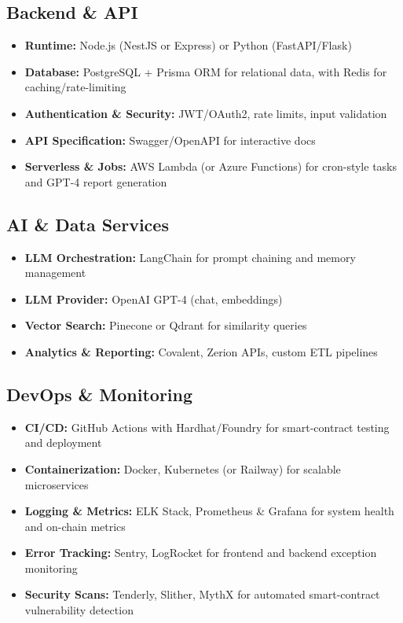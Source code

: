 \documentclass[13pt]{extarticle}
\begin{document}
\subsection{Backend \& API}
\begin{itemize}[left=1em]
  \item \textbf{Runtime:} Node.js (NestJS or Express) or Python (FastAPI/Flask)  
  \item \textbf{Database:} PostgreSQL + Prisma ORM for relational data, with Redis for caching/rate-limiting  
  \item \textbf{Authentication \& Security:} JWT/OAuth2, rate limits, input validation  
  \item \textbf{API Specification:} Swagger/OpenAPI for interactive docs  
  \item \textbf{Serverless \& Jobs:} AWS Lambda (or Azure Functions) for cron-style tasks and GPT-4 report generation  
\end{itemize}

\subsection{AI \& Data Services}
\begin{itemize}[left=1em]
  \item \textbf{LLM Orchestration:} LangChain for prompt chaining and memory management  
  \item \textbf{LLM Provider:} OpenAI GPT-4 (chat, embeddings)  
  \item \textbf{Vector Search:} Pinecone or Qdrant for similarity queries  
  \item \textbf{Analytics \& Reporting:} Covalent, Zerion APIs, custom ETL pipelines  
\end{itemize}

\subsection{DevOps \& Monitoring}
\begin{itemize}[left=1em]
  \item \textbf{CI/CD:} GitHub Actions with Hardhat/Foundry for smart-contract testing and deployment  
  \item \textbf{Containerization:} Docker, Kubernetes (or Railway) for scalable microservices  
  \item \textbf{Logging \& Metrics:} ELK Stack, Prometheus \& Grafana for system health and on-chain metrics  
  \item \textbf{Error Tracking:} Sentry, LogRocket for frontend and backend exception monitoring  
  \item \textbf{Security Scans:} Tenderly, Slither, MythX for automated smart-contract vulnerability detection  
\end{itemize}
\end{document}

